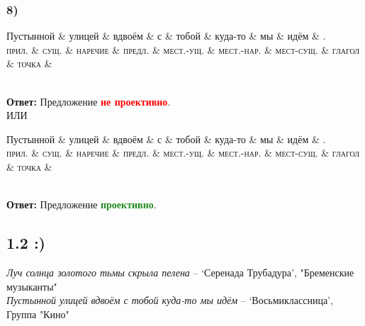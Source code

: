 \documentclass[14pt,extrafontsizes]{article}
\begin{document}
\subsubsection*{8)}
\begin{dependency}[theme = simple]
\begin{deptext}[column sep=1em]
Пустынной \& улицей \& вдвоём \& с \& тобой \& куда-то \& мы \& идём \& .\\
\textsc{прил.} \& \textsc{сущ.} \& \textsc{наречие} \& \textsc{предл.} \& \textsc{мест.-ущ.} \& \textsc{мест.-нар.} \& \textsc{мест-сущ.} \& \textsc{глагол} \& \textsc{точка} \&\\
\end{deptext}
\end{dependency}
\\
\textbf{Ответ: }Предложение \textcolor{red}{\textbf{не проективно}}.
\\
ИЛИ
\\
\begin{dependency}[theme = simple]
\begin{deptext}[column sep=1em]
Пустынной \& улицей \& вдвоём \& с \& тобой \& куда-то \& мы \& идём \& .\\
\textsc{прил.} \& \textsc{сущ.} \& \textsc{наречие} \& \textsc{предл.} \& \textsc{мест.-ущ.} \& \textsc{мест.-нар.} \& \textsc{мест-сущ.} \& \textsc{глагол} \& \textsc{точка} \&\\
\end{deptext}
\end{dependency}
\\
\textbf{Ответ: }Предложение \textcolor{ForestGreen}{\textbf{проективно}}.
\subsection*{1.2 :)}
\textit{Луч солнца золотого тьмы скрыла пелена} -- `Серенада Трубадура', "Бременские музыканты"\\
\textit{Пустынной улицей вдвоём с тобой куда-то мы идём} -- `Восьмиклассница', Группа "Кино"
\end{document}
